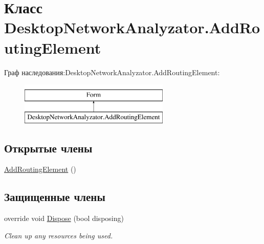 \hypertarget{class_desktop_network_analyzator_1_1_add_routing_element}{}\section{Класс Desktop\+Network\+Analyzator.\+Add\+Routing\+Element}
\label{class_desktop_network_analyzator_1_1_add_routing_element}
Граф наследования\+:Desktop\+Network\+Analyzator.\+Add\+Routing\+Element\+:\begin{figure}[H]
\begin{center}
\leavevmode
\includegraphics[height=2.000000cm]{class_desktop_network_analyzator_1_1_add_routing_element}
\end{center}
\end{figure}
\subsection*{Открытые члены}
\begin{DoxyCompactItemize}
\item 
\hyperlink{class_desktop_network_analyzator_1_1_add_routing_element_aa4cc1082bd6140946f8ed490fdeda7fd}{Add\+Routing\+Element} ()
\end{DoxyCompactItemize}
\subsection*{Защищенные члены}
\begin{DoxyCompactItemize}
\item 
override void \hyperlink{class_desktop_network_analyzator_1_1_add_routing_element_a5cb25bcd26e98e8ac07aa7982f4a5479}{Dispose} (bool disposing)
\begin{DoxyCompactList}\small\item\em Clean up any resources being used. \end{DoxyCompactList}\end{DoxyCompactItemize}
